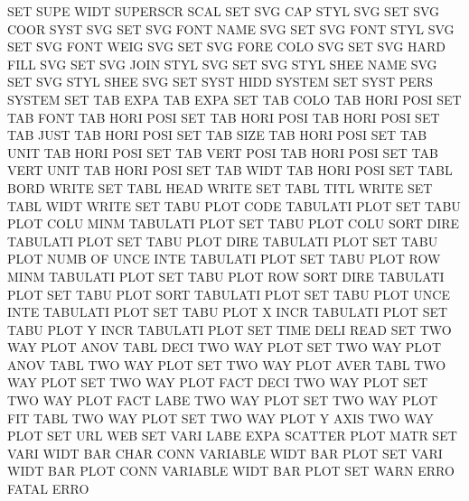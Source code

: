 SET      SUPE WIDT                      SUPERSCR SCAL
SET      SVG  CAP  STYL                 SVG
SET      SVG  COOR SYST                 SVG
SET      SVG  FONT NAME                 SVG
SET      SVG  FONT STYL                 SVG
SET      SVG  FONT WEIG                 SVG
SET      SVG  FORE COLO                 SVG
SET      SVG  HARD FILL                 SVG
SET      SVG  JOIN STYL                 SVG
SET      SVG  STYL SHEE NAME            SVG
SET      SVG  STYL SHEE                 SVG
SET      SYST HIDD                      SYSTEM
SET      SYST PERS                      SYSTEM
SET      TAB  EXPA                      TAB      EXPA
SET      TAB  COLO                      TAB HORI POSI
SET      TAB  FONT                      TAB HORI POSI
SET      TAB  HORI POSI                 TAB HORI POSI
SET      TAB  JUST                      TAB HORI POSI
SET      TAB  SIZE                      TAB HORI POSI
SET      TAB  UNIT                      TAB HORI POSI
SET      TAB  VERT POSI                 TAB HORI POSI
SET      TAB  VERT UNIT                 TAB HORI POSI
SET      TAB  WIDT                      TAB HORI POSI
SET      TABL BORD                      WRITE
SET      TABL HEAD                      WRITE
SET      TABL TITL                      WRITE
SET      TABL WIDT                      WRITE
SET      TABU PLOT CODE                 TABULATI PLOT
SET      TABU PLOT COLU MINM            TABULATI PLOT
SET      TABU PLOT COLU SORT DIRE       TABULATI PLOT
SET      TABU PLOT DIRE                 TABULATI PLOT
SET      TABU PLOT NUMB OF   UNCE INTE  TABULATI PLOT
SET      TABU PLOT ROW  MINM            TABULATI PLOT
SET      TABU PLOT ROW  SORT DIRE       TABULATI PLOT
SET      TABU PLOT SORT                 TABULATI PLOT
SET      TABU PLOT UNCE INTE            TABULATI PLOT
SET      TABU PLOT X    INCR            TABULATI PLOT
SET      TABU PLOT Y    INCR            TABULATI PLOT
SET      TIME DELI                      READ
SET      TWO  WAY  PLOT ANOV TABL DECI  TWO      WAY  PLOT
SET      TWO  WAY  PLOT ANOV TABL       TWO      WAY  PLOT
SET      TWO  WAY  PLOT AVER TABL       TWO      WAY  PLOT
SET      TWO  WAY  PLOT FACT DECI       TWO      WAY  PLOT
SET      TWO  WAY  PLOT FACT LABE       TWO      WAY  PLOT
SET      TWO  WAY  PLOT FIT  TABL       TWO      WAY  PLOT
SET      TWO  WAY  PLOT Y    AXIS       TWO      WAY  PLOT
SET      URL                            WEB
SET      VARI LABE EXPA                 SCATTER  PLOT MATR
SET      VARI WIDT BAR  CHAR CONN       VARIABLE WIDT BAR  PLOT
SET      VARI WIDT BAR  PLOT CONN       VARIABLE WIDT BAR  PLOT
SET      WARN ERRO                      FATAL    ERRO
